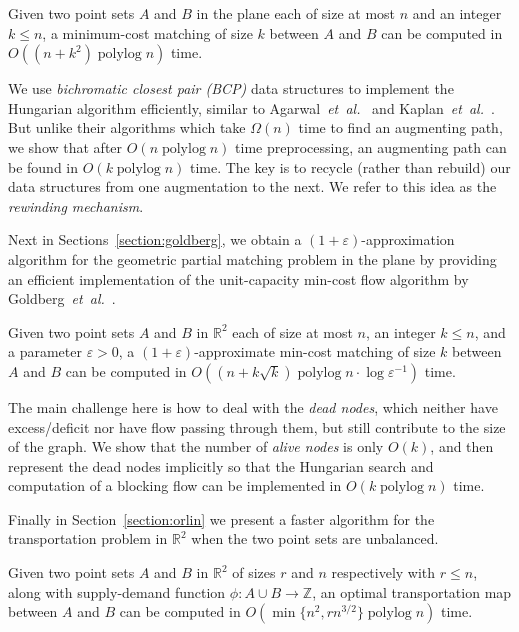 \documentclass[a4paper,UKenglish]{socg-lipics-v2019}
\def\etal{\emph{et~al.}}
\def\etal{\textit{et~al.}}
\def\polylog{\mathop{\mathrm{polylog}}}
\def\eps{\varepsilon}
\def\reals{\mathbb{R}}
\def\ints{\mathbb{Z}}
\def\tsupply{\phi}
\theoremstyle{plain}
\numberwithin{figure}{section}
\begin{document}
\begin{theorem}
\label{theorem:hung}
Given two point sets $A$ and $B$ in the plane each of size at most $n$ and an
integer $k \leq n$, a minimum-cost matching of size $k$ between $A$ and $B$ can
be computed in $O((n + k^2)\polylog n)$ time.
\end{theorem}

We use \emph{bichromatic closest pair (BCP)} data structures to implement the Hungarian algorithm efficiently, similar to Agarwal~\etal~\cite{AES99} and Kaplan~\etal~\cite{KMRSS17}.
But unlike their algorithms which take $\Omega(n)$ time to find an
augmenting path, we show that after $O(n\polylog n)$ time preprocessing,
an augmenting path can be found in $O(k\polylog n)$ time.
The key is to recycle (rather than rebuild) our data structures from one
augmentation to the next.
We refer to this idea as the \emph{rewinding mechanism}.

\medskip

Next in Sections~\ref{section:goldberg},
we obtain a $(1+\eps)$-approximation algorithm for the geometric partial
matching problem in the plane by providing an efficient implementation of the
unit-capacity min-cost flow algorithm by Goldberg~\etal~\cite{GHKT17}.

\begin{theorem}
\label{theorem:gmcm}
Given two point sets $A$ and $B$ in $\reals^2$ each of size at most $n$,
an integer $k \leq n$, and a parameter $\eps > 0$, a $(1+\eps)$-approximate
min-cost matching of size $k$ between $A$ and $B$ can be computed in
$O((n + k\sqrt{k})\polylog n \cdot \log\eps^{-1})$ time.
\end{theorem}

The main challenge here is how to deal with the \emph{dead nodes},
which neither have excess/deficit nor have flow passing through them,
but still contribute to the size of the graph.
We show that the number of \emph{alive nodes} is only $O(k)$, and then
represent the dead nodes implicitly so that the Hungarian search and
computation of a blocking flow can be implemented in $O(k\polylog n)$ time.

\medskip

Finally in Section~\ref{section:orlin} we present a faster algorithm for the
transportation problem in $\reals^2$ when the two point sets are unbalanced.

\begin{theorem}
\label{theorem:orlin}
Given two point sets $A$ and $B$ in $\reals^2$ of sizes $r$ and $n$ respectively
with $r \leq n$, along with supply-demand function $\tsupply:A \cup B \to \ints$,
an optimal transportation map between $A$ and $B$ can be computed in
$O(\min\{n^2, rn^{3/2}\}\polylog n)$ time.
\end{theorem}
\end{document}
